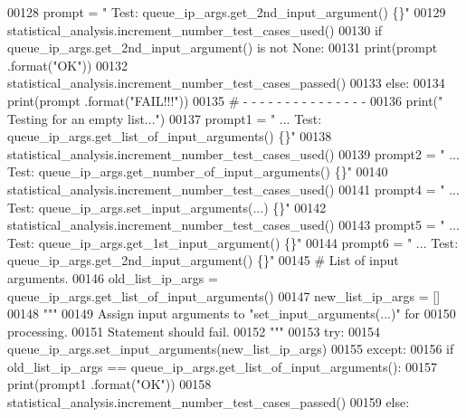 \begin{DoxyCode}
00128         prompt = \textcolor{stringliteral}{"  Test: queue\_ip\_args.get\_2nd\_input\_argument()        \{\}"}
00129         statistical\_analysis.increment\_number\_test\_cases\_used()
00130         \textcolor{keywordflow}{if} queue\_ip\_args.get\_2nd\_input\_argument() \textcolor{keywordflow}{is} \textcolor{keywordflow}{not} \textcolor{keywordtype}{None}:
00131             print(prompt .format(\textcolor{stringliteral}{"OK"}))
00132             statistical\_analysis.increment\_number\_test\_cases\_passed()
00133         \textcolor{keywordflow}{else}:
00134             print(prompt .format(\textcolor{stringliteral}{"FAIL!!!"}))
00135         \textcolor{comment}{#   -   -   -   -   -   -   -   -   -   -   -   -   -   -   -}
00136         print(\textcolor{stringliteral}{" Testing for an empty list..."})
00137         prompt1 = \textcolor{stringliteral}{" ... Test: queue\_ip\_args.get\_list\_of\_input\_arguments()   \{\}"}
00138         statistical\_analysis.increment\_number\_test\_cases\_used()
00139         prompt2 = \textcolor{stringliteral}{" ... Test: queue\_ip\_args.get\_number\_of\_input\_arguments() \{\}"}
00140         statistical\_analysis.increment\_number\_test\_cases\_used()
00141         prompt4 = \textcolor{stringliteral}{" ... Test: queue\_ip\_args.set\_input\_arguments(...)    \{\}"}
00142         statistical\_analysis.increment\_number\_test\_cases\_used()
00143         prompt5 = \textcolor{stringliteral}{" ... Test: queue\_ip\_args.get\_1st\_input\_argument()    \{\}"}
00144         prompt6 = \textcolor{stringliteral}{" ... Test: queue\_ip\_args.get\_2nd\_input\_argument()    \{\}"}
00145         \textcolor{comment}{#   List of input arguments.}
00146         old\_list\_ip\_args = queue\_ip\_args.get\_list\_of\_input\_arguments()
00147         new\_list\_ip\_args = []
00148         \textcolor{stringliteral}{"""}
00149 \textcolor{stringliteral}{            Assign input arguments to "set\_input\_arguments(...)" for}
00150 \textcolor{stringliteral}{                processing.}
00151 \textcolor{stringliteral}{            Statement should fail.}
00152 \textcolor{stringliteral}{        """}
00153         \textcolor{keywordflow}{try}:
00154             queue\_ip\_args.set\_input\_arguments(new\_list\_ip\_args)
00155         \textcolor{keywordflow}{except}:
00156             \textcolor{keywordflow}{if} old\_list\_ip\_args == queue\_ip\_args.get\_list\_of\_input\_arguments():
00157                 print(prompt1 .format(\textcolor{stringliteral}{"OK"}))
00158                 statistical\_analysis.increment\_number\_test\_cases\_passed()
00159             \textcolor{keywordflow}{else}:

\end{DoxyCode}
